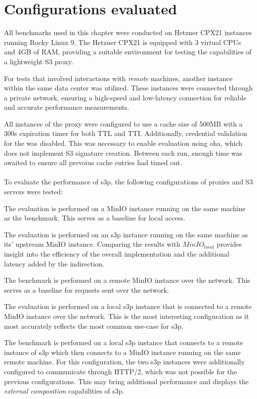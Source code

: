 \section{Configurations evaluated}
\label{configurations}
All benchmarks used in this chapter were conducted on Hetzner CPX21 instances running Rocky Linux 9. The Hetzner CPX21 is equipped with 3 virtual CPUs and 4GB of RAM, providing a suitable environment for testing the capabilities of a lightweight S3 proxy\cite{HETZNER}.

For tests that involved interactions with \textit{remote} machines, another instance within the same data center was utilized. These instances were connected through a private network, ensuring a high-speed and low-latency connection for reliable and accurate performance measurements.

All instances of the proxy were configured to use a cache size of 500MB with a 300s expiration timer for both TTL and TTI. Additionally, credential validation for the  was disabled. This was necessary to enable evaluation using oha, which does not implement S3 signature creation. Between each run, enough time was awaited to ensure all prevoius cache entries had timed out.
\\\\
To evaluate the performance of s3p, the following configurations of proxies and S3 servers were tested:
\begin{description}[style=nextline] %
	\item[${MinIO}_{local}$] The evaluation is performed on a MinIO instance running on the same machine as the benchmark. This serves as a baseline for local access.
	\item[${s3p}_{local}$] The evaluation is performed on an s3p instance running on the same machine as its' upstream MinIO instance. Comparing the results with ${MinIO}_{local}$ provides insight into the efficiency of the overall implementation and the additional latency added by the indirection.
	\item[${MinIO}_{remote}$] The benchmark is performed on a remote MinIO instance over the network. This serves as a baseline for requests sent over the network.
	\item[${s3p}_{remote}$] The evaluation is performed on a local s3p instance that is connected to a remote MinIO instance over the network. This is the most interesting configuration as it most accurately reflects the most common use-case for s3p.
	\item[${s3p}_{dual}$] The benchmark is performed on a local s3p instance that connects to a remote instance of s3p which then connects to a MinIO instance running on the same remote machine. For this configuration, the two s3p instances were additionally configured to communicate through HTTP/2, which was not possible for the previous configurations. This may bring additional performance and displays the \textit{external composition} capabilities of s3p.
\end{description}

